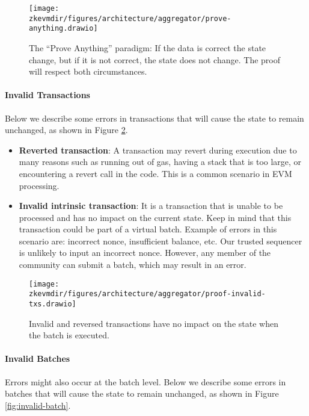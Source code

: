 \begin{figure}[H]
\centering
\texttt{[image: \\zkevmdir/figures/architecture/aggregator/prove-anything.drawio]}
\caption{The ``Prove Anything'' paradigm: If the data is correct the state change, but if it is not correct, the state does not change. The proof will respect both circumstances. }
\label{fig:prove-anything}
\end{figure}

\paragraph*{Invalid Transactions} Below we describe some errors in transactions that will cause the state to remain unchanged, as shown in Figure \ref{fig:invalid-txs}.

\begin{itemize}

\item \textbf{Reverted transaction}:
A transaction may revert during execution due to many reasons such as running out of gas, having a stack that is too large, or encountering a revert call in the code. This is a common scenario in EVM processing.

\item \textbf{Invalid intrinsic transaction}:
It is a transaction that is unable to be processed and has no impact on the current state. Keep in mind that this transaction could be part of a virtual batch. Example of errors in this scenario are: incorrect nonce, insufficient balance, etc. Our trusted sequencer is unlikely to input an incorrect nonce. However, any member of the community can submit a batch, which may result in an error.

\end{itemize}

\begin{figure}[H]
\centering
\texttt{[image: \\zkevmdir/figures/architecture/aggregator/proof-invalid-txs.drawio]}
\caption{Invalid and reversed transactions have no impact on the state when the batch is executed.}
\label{fig:invalid-txs}
\end{figure}

\paragraph*{Invalid Batches} Errors might also occur at the batch level. Below we describe some errors in batches that will cause the state to remain unchanged, as shown in Figure \ref{fig:invalid-batch}.


